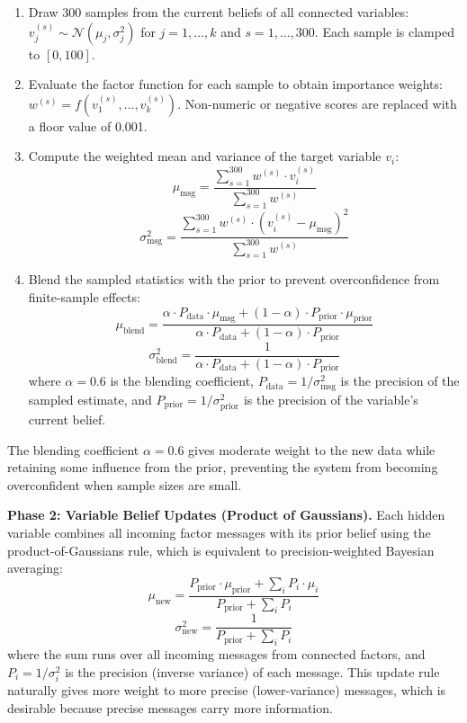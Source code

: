 \documentclass[journal]{IEEEtran}
\begin{document}
\begin{enumerate}
\item Draw 300 samples from the current beliefs of all connected variables: $v_j^{(s)} \sim \mathcal{N}(\mu_j, \sigma_j^2)$ for $j = 1, \ldots, k$ and $s = 1, \ldots, 300$. Each sample is clamped to $[0, 100]$.
\item Evaluate the factor function for each sample to obtain importance weights: $w^{(s)} = f(v_1^{(s)}, \ldots, v_k^{(s)})$. Non-numeric or negative scores are replaced with a floor value of 0.001.
\item Compute the weighted mean and variance of the target variable $v_i$:
\begin{equation}
\mu_{\text{msg}} = \frac{\sum_{s=1}^{300} w^{(s)} \cdot v_i^{(s)}}{\sum_{s=1}^{300} w^{(s)}}
\end{equation}
\begin{equation}
\sigma^2_{\text{msg}} = \frac{\sum_{s=1}^{300} w^{(s)} \cdot (v_i^{(s)} - \mu_{\text{msg}})^2}{\sum_{s=1}^{300} w^{(s)}}
\end{equation}
\item Blend the sampled statistics with the prior to prevent overconfidence from finite-sample effects:
\begin{equation}
\mu_{\text{blend}} = \frac{\alpha \cdot P_{\text{data}} \cdot \mu_{\text{msg}} + (1-\alpha) \cdot P_{\text{prior}} \cdot \mu_{\text{prior}}}{\alpha \cdot P_{\text{data}} + (1-\alpha) \cdot P_{\text{prior}}}
\end{equation}
\begin{equation}
\sigma^2_{\text{blend}} = \frac{1}{\alpha \cdot P_{\text{data}} + (1-\alpha) \cdot P_{\text{prior}}}
\end{equation}
where $\alpha = 0.6$ is the blending coefficient, $P_{\text{data}} = 1/\sigma^2_{\text{msg}}$ is the precision of the sampled estimate, and $P_{\text{prior}} = 1/\sigma^2_{\text{prior}}$ is the precision of the variable's current belief.
\end{enumerate}

The blending coefficient $\alpha = 0.6$ gives moderate weight to the new data while retaining some influence from the prior, preventing the system from becoming overconfident when sample sizes are small.

\textbf{Phase 2: Variable Belief Updates (Product of Gaussians).} Each hidden variable combines all incoming factor messages with its prior belief using the product-of-Gaussians rule, which is equivalent to precision-weighted Bayesian averaging:
\begin{equation}
\mu_{\text{new}} = \frac{P_{\text{prior}} \cdot \mu_{\text{prior}} + \sum_{i} P_i \cdot \mu_i}{P_{\text{prior}} + \sum_{i} P_i}
\end{equation}
\begin{equation}
\sigma^2_{\text{new}} = \frac{1}{P_{\text{prior}} + \sum_{i} P_i}
\end{equation}
where the sum runs over all incoming messages from connected factors, and $P_i = 1/\sigma^2_i$ is the precision (inverse variance) of each message. This update rule naturally gives more weight to more precise (lower-variance) messages, which is desirable because precise messages carry more information.
\end{document}
